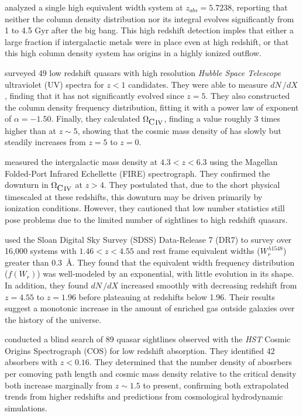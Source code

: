\documentclass[linenumbers,twocolumn]{aastex61}
\begin{document}
\cite{Ryan-Weber2006} analyzed a single high equivalent width {\CIV} system at $z_{abs} = 5.7238$, reporting that neither the column density distribution nor its integral evolves significantly from 1 to 4.5 Gyr after the big bang. This high redshift detection imples that either a large fraction if intergalactic metals were in place even at high redshift, or that this high column density system has origins in a highly ionized outflow.

\cite{Cooksey2010} surveyed 49 low redshift quasars with high resolution {\it Hubble Space Telescope} ultraviolet (UV) spectra for $z < 1$ {\CIV} candidates. They were able to measure $dN\,/dX$, finding that it has not significantly evolved since $z = 5$. They also constructed the column density frequency distribution, fitting it with a power law of exponent of $\alpha = -1.50$. Finally, they calculated $\Omega_{\hbox{{\rm C}\kern 0.1em{\sc iv}}}$, finding a value roughly 3 times higher than at $z \sim 5$, showing that the cosmic mass density of {\CIV} has slowly but steadily increases from $z = 5$ to $z = 0$.

\cite{Simcoe2011} measured the intergalactic {\CIV} mass density at $4.3 < z < 6.3$ using the Magellan Folded-Port Infrared Echellette (FIRE) spectrograph. They confirmed the downturn in $\Omega_{\hbox{{\rm C}\kern 0.1em{\sc iv}}}$ at $z > 4$. They postulated that, due to the short physical timescaled at these redshifts, this downturn may be driven primarily by ionization conditions. However, they cautioned that low number statistics still pose problems due to the limited number of sightlines to high redshift quasars.

\cite{Cooksey2013} used the Sloan Digital Sky Survey (SDSS) Data-Release 7 (DR7) to survey over 16,000 {\CIV} systems with $1.46 < z < 4.55$ and rest frame equivalent widths ($W_r^{\lambda1548}$) greater than $0.3$~{\AA}. They found that the equivalent width frequency distribution ($f(W_r)$) was well-modeled by an exponential, with little evolution in its shape. In addition, they found $dN\,/dX$ increased smoothly with decreasing redshift from $z = 4.55$ to $z = 1.96$ before plateauing at redshifts below 1.96. Their results suggest a monotonic increase in the amount of {\CIV} enriched gas outside galaxies over the history of the universe.

\cite{Burchett2015} conducted a blind search of 89 quasar sightlines observed with the {\it HST} Cosmic Origins Spectrograph (COS) for low redshift {\CIV} absorption. They identified 42 absorbers with $z < 0.16$. They determined that the number density of {\CIV} abosrbers per comoving path length and cosmic mass density relative to the critical density both increase marginally from $z \sim 1.5$ to present, confirming both extrapolated trends from higher redshifts and predictions from cosmological hydrodynamic simulations.
\end{document}
